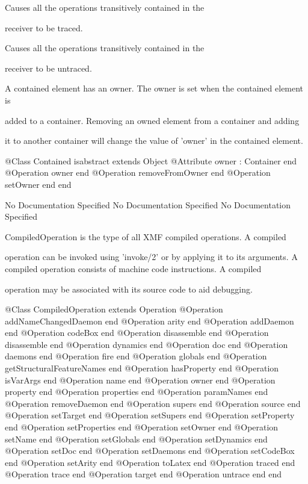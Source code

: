       Causes all the operations transitively contained in the

      receiver to be traced.

      Causes all the operations transitively contained in the

      receiver to be untraced.

      A contained element has an owner. The owner is set when the contained element is

      added to a container. Removing an owned element from a container and adding

      it to another container will change the value of 'owner' in the contained element.
\begin{Interface}
@Class Contained isabstract extends Object
  @Attribute owner : Container end
  @Operation owner end
  @Operation removeFromOwner end
  @Operation setOwner end
end
\end{Interface}
No Documentation Specified
No Documentation Specified
No Documentation Specified

      CompiledOperation is the type of all XMF compiled operations. A compiled

      operation can be invoked using 'invoke/2' or by applying it to its arguments.
      A compiled operation consists of machine code instructions. A compiled

      operation may be associated with its source code to aid debugging.
\begin{Interface}
@Class CompiledOperation extends Operation
  @Operation addNameChangedDaemon end
  @Operation arity end
  @Operation addDaemon end
  @Operation codeBox end
  @Operation disassemble end
  @Operation disassemble end
  @Operation dynamics end
  @Operation doc end
  @Operation daemons end
  @Operation fire end
  @Operation globals end
  @Operation getStructuralFeatureNames end
  @Operation hasProperty end
  @Operation isVarArgs end
  @Operation name end
  @Operation owner end
  @Operation property end
  @Operation properties end
  @Operation paramNames end
  @Operation removeDaemon end
  @Operation supers end
  @Operation source end
  @Operation setTarget end
  @Operation setSupers end
  @Operation setProperty end
  @Operation setProperties end
  @Operation setOwner end
  @Operation setName end
  @Operation setGlobals end
  @Operation setDynamics end
  @Operation setDoc end
  @Operation setDaemons end
  @Operation setCodeBox end
  @Operation setArity end
  @Operation toLatex end
  @Operation traced end
  @Operation trace end
  @Operation target end
  @Operation untrace end
end
\end{Interface}

